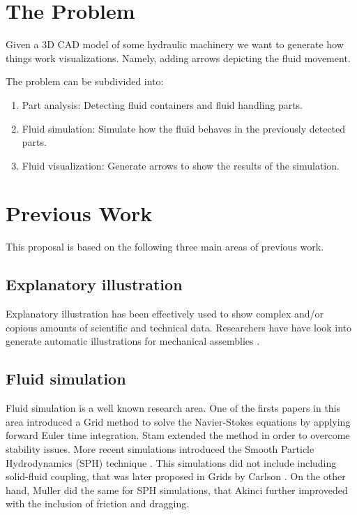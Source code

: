 \documentclass[11pt]{report}
\begin{document}

\section{The Problem}
\label{sec:problem}

Given a 3D CAD model of some hydraulic machinery we want to generate 
how things work visualizations. Namely, adding arrows depicting the fluid movement.

The problem can be subdivided into:
\begin{enumerate}
\item Part analysis: Detecting fluid containers and fluid handling parts.
\item Fluid simulation: Simulate how the fluid behaves in the previously detected parts.
\item Fluid visualization: Generate arrows to show the results of the simulation. 
\end{enumerate}

\section{Previous Work}

This proposal is based on the following three main areas of previous work.

\subsection{Explanatory illustration}

Explanatory illustration has been effectively used to show complex and/or
copious amounts of  scientific and technical data. Researchers have
have look into generate automatic illustrations for mechanical assemblies \cite{Mitra2010}.


\subsection{Fluid simulation}

Fluid simulation is a well known research area. One of the firsts papers in this area
introduced a Grid method \cite{Foster1996} to solve the Navier-Stokes
equations by applying forward Euler time integration. Stam \cite{Stam1999} extended 
the method in order to overcome stability issues. More recent simulations introduced the Smooth
Particle Hydrodynamics (SPH) technique \cite{DesbrunMathieuandGascuel1996}. 
This simulations did not include including solid-fluid coupling, that was later
proposed in Grids by Carlson \cite{Carlson2004}. On the other hand, Muller \cite{Muller2004} did the
same for SPH simulations, that Akinci \cite{Akinci2012} further improveded with the 
inclusion of friction and dragging.
\end{document}
